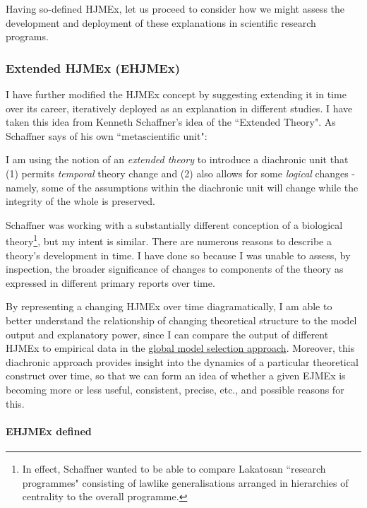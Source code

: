 Having so-defined HJMEx, let us proceed to consider how we might assess the development and deployment of these explanations in scientific research programs.

\subsubsection{Extended HJMEx (EHJMEx)}

I have further modified the HJMEx concept by suggesting extending it in time over its career, iteratively deployed as an explanation in different studies. I have taken this idea from Kenneth Schaffner's idea of the ``Extended Theory". As Schaffner says of his own ``metascientific unit":

\begin{longquote}

I am using the notion of an \textit{extended theory} to introduce a diachronic unit that (1) permits \textit{temporal} theory change and (2) also allows for some \textit{logical} changes - namely, some of the assumptions within the diachronic unit will change while the integrity of the whole is preserved. 
\cite[p,211]{Schaffner1993}
\end{longquote}

 Schaffner was working with a substantially different conception of a biological theory\footnote{In effect, Schaffner wanted to be able to compare Lakatosan ``research programmes" consisting of lawlike generalisations arranged in hierarchies of centrality to the overall programme.}, but my intent is similar. There are numerous reasons to describe a theory's development in time. I have done so because I was unable to assess, by inspection, the broader significance of changes to components of the theory as expressed in different primary reports over time. 
 
 By representing a changing HJMEx over time diagramatically, I am able to better understand the relationship of changing theoretical structure to the model output and explanatory power, since I can compare the output of different HJMEx to empirical data in the \hyperref[model] {global model selection approach}. Moreover, this diachronic approach provides insight into the dynamics of a particular theoretical construct over time, so that we can form an idea of whether a given EJMEx is becoming more or less useful, consistent, precise, etc., and possible reasons for this.
 
 \paragraph{EHJMEx defined}

